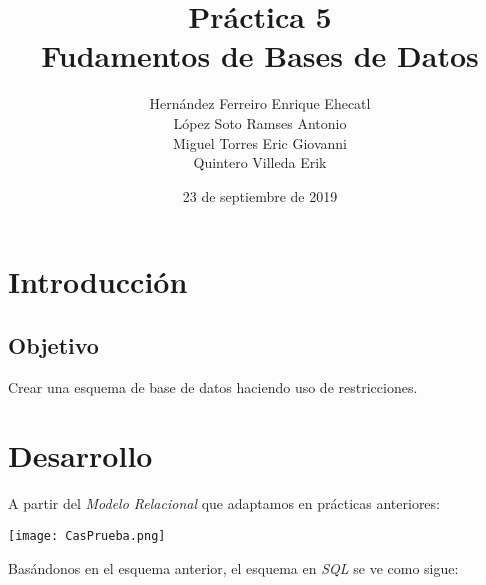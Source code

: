 \documentclass[12pt, letterpaper]{article}
\author{Hernández Ferreiro Enrique Ehecatl \\
        López Soto Ramses Antonio \\
        Miguel Torres Eric Giovanni \\
        Quintero Villeda Erik}
\title{Práctica 5 \\
       {\small Fudamentos de Bases de Datos}}
\date{23 de septiembre de 2019}
\begin{document}
    \maketitle

    \section*{Introducción}

        \subsection*{Objetivo}
        Crear una esquema de base de datos haciendo uso de restricciones.

    \section*{Desarrollo}
    A partir del \textit{Modelo Relacional} que adaptamos en prácticas anteriores: \vspace{.2cm}

    \begin{center}
        \texttt{[image: CasPrueba.png]}
    \end{center}

    Basándonos en el esquema anterior, el esquema en \textit{SQL} se ve como sigue: \vspace{.3cm}
    
\end{document}

